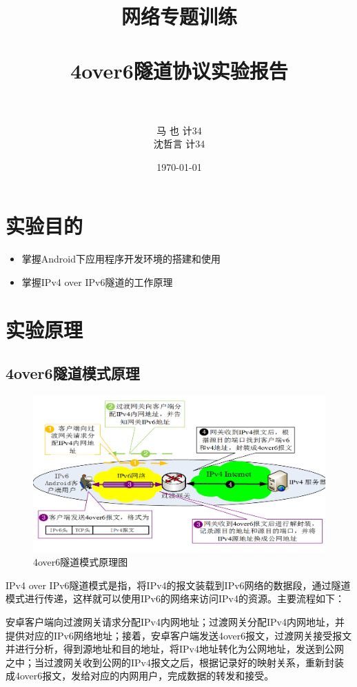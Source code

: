 \documentclass[paper=a4, fontsize=11pt, UTF8]{article} %
\title{
\normalfont \normalsize
\textsc{\kaishu 网络专题训练} \\ [5pt] %
\horrule{0.5pt} \\[0.4cm] %
\huge 4over6隧道协议实验报告 \\ %
\horrule{2pt} \\[0.5cm] %
}
\author{马 \;  也\quad 2013011365 \quad 计34\\ 沈哲言\quad 2013011371 \quad 计34}
\date{\normalsize\today} %
\numberwithin{equation}{section} %
\numberwithin{figure}{section} %
\numberwithin{table}{section} %
\begin{document}
\maketitle %


\fontsize{11pt}{18pt}\selectfont

\section{实验目的}

\begin{itemize}
\item 掌握Android下应用程序开发环境的搭建和使用
\item 掌握IPv4 over IPv6隧道的工作原理
\end{itemize}


\section{实验原理}

\subsection{4over6隧道模式原理}

\begin{figure}[htp]
\includegraphics[width=\textwidth]{fig1}
\caption{4over6隧道模式原理图}
\end{figure}

IPv4 over IPv6隧道模式是指，将IPv4的报文装载到IPv6网络的数据段，通过隧道模式进行传递，这样就可以使用IPv6的网络来访问IPv4的资源。主要流程如下：

安卓客户端向过渡网关请求分配IPv4内网地址；过渡网关分配IPv4内网地址，并提供对应的IPv6网络地址；接着，安卓客户端发送4over6报文，过渡网关接受报文并进行分析，得到源地址和目的地址，将IPv4地址转化为公网地址，发送到公网之中；当过渡网关收到公网的IPv4报文之后，根据记录好的映射关系，重新封装成4over6报文，发给对应的内网用户，完成数据的转发和接受。
\end{document}
